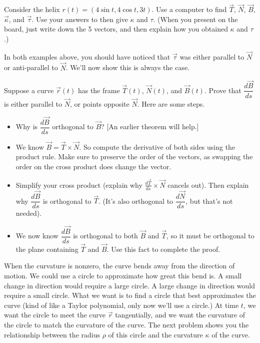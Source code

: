 \begin{problem}
 Consider the helix $r(t)=(4\sin t, 4\cos t, 3t)$. Use a computer to find $\vec T$, $\vec N$, $\vec B$, $\vec \kappa$, and $\vec \tau$. Use your answers to then give $\kappa$ and $\tau$. (When you present on the board, just write down the 5 vectors, and then explain how you obtained $\kappa$ and $\tau$.)
\end{problem}

In both examples above, you should have noticed that $\vec \tau$ was either parallel to $\vec N$ or anti-parallel to $\vec N$.  We'll now show this is always the case.

\begin{problem}
 Suppose a curve $\vec r(t)$ has the frame $\vec T(t)$, $\vec N(t)$, and $\vec B(t)$. Prove that $\dfrac{d\vec B}{ds}$ is either parallel to $\vec N$, or points opposite $\vec N$. Here are some steps.
 \begin{itemize}
  \item Why is $\dfrac{d\vec B}{ds}$ orthogonal to $\vec B$? [An earlier theorem will help.]
  \item We know $\vec B=\vec T\times \vec N$. So compute the derivative of both sides using the product rule. Make sure to preserve the order of the vectors, as swapping the order on the cross product does change the vector.  
  \item Simplify your cross product (explain why $\frac{d\vec T}{ds}\times \vec N$ cancels out). Then explain why $\dfrac{d\vec B}{ds}$ is orthogonal to $\vec T$. (It's also orthogonal to $\dfrac{d\vec N}{ds}$, but that's not needed).
  \item We now know $\dfrac{d\vec B}{ds}$ is orthogonal to both $\vec B$ and $\vec T$, so it must be orthogonal to the plane containing $\vec T$ and $\vec B$. Use this fact to complete the proof.
 \end{itemize}
\end{problem}


When the curvature is nonzero, the curve bends away from the direction of motion.  We could use a circle to approximate how great this bend is. A small change in direction would require a large circle.  A large change in direction would require a small circle. 
What we want is to find a circle that best approximates the curve (kind of like a Taylor polynomial, only now we'll use a circle.) At time $t$, we want the circle to meet the curve $\vec r$ tangentially, and we want the curvature of the circle to match the curvature of the curve.  The next problem shows you the relationship between the radius $\rho$ of this circle and the curvature $\kappa$ of the curve.


